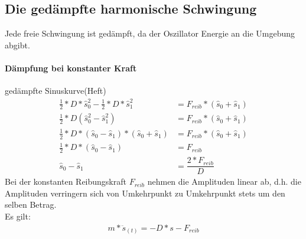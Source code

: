 	\subsection{Die gedämpfte harmonische Schwingung}
	Jede freie Schwingung ist gedämpft, da der Oszillator Energie an die Umgebung abgibt.
	\paragraph{Dämpfung bei konstanter Kraft}
	gedämpfte Sinuskurve(Heft)
	\begin{align}
	\frac{1}{2}*D*\hat{s}_{0}^2-\frac{1}{2}*D*\hat{s}_{1}^2&=F_{reib}*(\hat{s}_0+\hat{s}_1)\nonumber\\
	\frac{1}{2}*D(\hat{s}_0^2-\hat{s}_1^2)&=F_{reib}*(\hat{s}_0+\hat{s}_1)\nonumber\\
	\frac{1}{2}*D*(\hat{s}_0-\hat{s}_1)*(\hat{s}_0+\hat{s}_1)&=F_{reib}*(\hat{s}_0+\hat{s}_1)\nonumber\\
	\frac{1}{2}*D*(\hat{s}_0-\hat{s}_1)&=F_{reib}\nonumber\\
	\hat{s}_0-\hat{s}_1&=\dfrac{2*F_{reib}}{D}
	\end{align}
	Bei der konstanten Reibungskraft $F_{reib}$ nehmen die Amplituden linear ab, d.h. die Amplituden verringern sich von Umkehrpunkt zu Umkehrpunkt stets um den selben Betrag.\\
	Es gilt:
	\begin{align}
		m*\ddot{s}_{(t)}=-D*s-F_{reib}
	\end{align}
